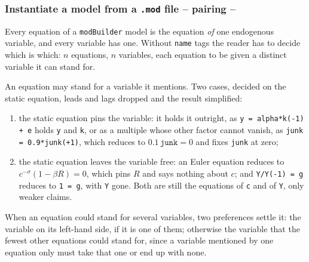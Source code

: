 \documentclass[10pt,slidestop]{beamer}
\theoremstyle{plain}
\begin{document}
\begin{frame}[fragile]
  \frametitle{Instantiate a model from a \texttt{.mod} file -- pairing --}

  Every equation of a \texttt{modBuilder} model is the equation \emph{of} one endogenous
  variable, and every variable has one. Without \texttt{name} tags the reader has to
  decide which is which: $n$ equations, $n$ variables, each equation to be given a
  distinct variable it can stand for.

  \medskip
  An equation may stand for a variable it mentions. Two cases, decided on the static
  equation, leads and lags dropped and the result simplified:
  \begin{enumerate}\small
  \item the static equation pins the variable: it holds it outright, as
    \texttt{y = alpha*k(-1) + e} holds \texttt{y} and \texttt{k}, or as a multiple whose
    other factor cannot vanish, as \texttt{junk = 0.9*junk(+1)}, which reduces to
    $0.1\,\texttt{junk} = 0$ and fixes \texttt{junk} at zero;
  \item the static equation leaves the variable free: an Euler equation reduces to
    $c^{-\sigma}(1 - \beta R) = 0$, which pins $R$ and says nothing about $c$; and
    \texttt{Y/Y(-1) = g} reduces to \texttt{1 = g}, with \texttt{Y} gone. Both are
    still the equations of \texttt{c} and of \texttt{Y}, only weaker claims.
  \end{enumerate}

  \medskip
  When an equation could stand for several variables, two preferences settle it: the
  variable on its left-hand side, if it is one of them; otherwise the variable that the
  fewest other equations could stand for, since a variable mentioned by one equation
  only must take that one or end up with none.

\end{frame}
\end{document}
